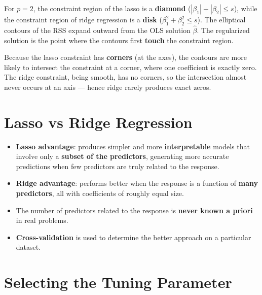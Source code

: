 \documentclass[11pt,a4paper]{article}
\theoremstyle{definition}
\theoremstyle{plain}
\theoremstyle{remark}
\begin{document}
For $p = 2$, the constraint region of the lasso is a \textbf{diamond} ($|\beta_1| + |\beta_2| \leq s$), while the constraint region of ridge regression is a \textbf{disk} ($\beta_1^2 + \beta_2^2 \leq s$). The elliptical contours of the RSS expand outward from the OLS solution $\hat{\beta}$. The regularized solution is the point where the contours first \textbf{touch} the constraint region.

Because the lasso constraint has \textbf{corners} (at the axes), the contours are more likely to intersect the constraint at a corner, where one coefficient is exactly zero. The ridge constraint, being smooth, has no corners, so the intersection almost never occurs at an axis --- hence ridge rarely produces exact zeros.

\section{Lasso vs Ridge Regression}

\begin{tcolorbox}[colback=green!5!white,colframe=green!75!black,title=\textbf{Comparison}]
\begin{itemize}
    \item \textbf{Lasso advantage}: produces simpler and more \textbf{interpretable} models that involve only a \textbf{subset of the predictors}, generating more accurate predictions when few predictors are truly related to the response.
    \item \textbf{Ridge advantage}: performs better when the response is a function of \textbf{many predictors}, all with coefficients of roughly equal size.
    \item The number of predictors related to the response is \textbf{never known a priori} in real problems.
    \item \textbf{Cross-validation} is used to determine the better approach on a particular dataset.
\end{itemize}
\end{tcolorbox}

\section{Selecting the Tuning Parameter}
\end{document}
